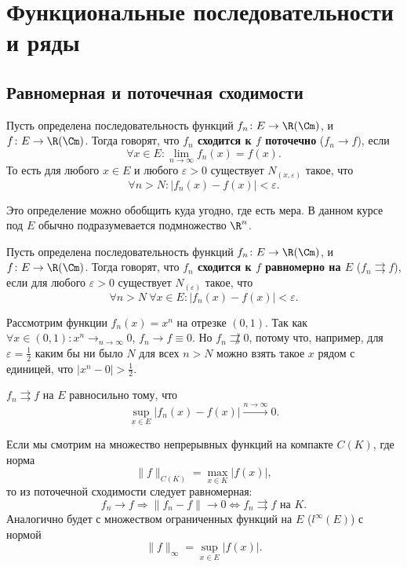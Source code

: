 \chapter{Функциональные последовательности и ряды}
\section{Равномерная и поточечная сходимости}

\begin{defn}
	Пусть определена последовательность функций $ f_n\colon E \to \R (\Cm)$, и $ f\colon E \to \R(\Cm)$. Тогда говорят, что {\bf $ f_n$ сходится к  $ f$ поточечно} ($ f_n \to  f$), если
	\[
		\forall x \in E\colon \lim_{n \to \infty} f_n (x) = f(x)
	.\]
	То есть для любого  $ x \in E$ и любого $ \varepsilon >0$ существует $ N_{(x, \varepsilon )}$ такое, что
	\[
		\forall n > N\colon \lvert f_n(x) - f(x) \rvert < \varepsilon
	.\]
\end{defn}
\begin{note}
	Это определение можно обобщить куда угодно, где есть мера.
	В данном курсе под $ E$ обычно подразумевается подмножество $ \R^{n}$.
\end{note}

\begin{defn}
	Пусть определена последовательность функций $ f_n\colon E \to \R (\Cm)$, и $ f\colon E \to \R(\Cm)$. Тогда говорят, что {\bf $ f_n$ сходится к  $ f$ равномерно на $ E$} ($ f_n \rightrightarrows  f$), если
	для любого $ \varepsilon >0$ существует $ N_{(\varepsilon )}$ такое, что
	\[
		\forall n > N ~ \forall x \in E \colon \lvert f_n(x) - f(x)  \rvert < \varepsilon
	.\]
\end{defn}

\begin{ex}
	Рассмотрим функции $ f_n(x) = x^{n}$ на отрезке $ (0, 1)$. Так как $ \forall x \in  (0, 1)\colon  x^{n} \mathrel{\rightarrow}_{n \to  \infty} 0$, $ f_n \to  f \equiv 0$. Но $ f_n \not\rightrightarrows 0$, потому что, например, для  $ \varepsilon = \frac{1}{2}$ каким бы ни было $ N$ для всех $ n > N$ можно взять такое $ x$ рядом с единицей, что  $ \lvert x^{n}-0 \rvert > \frac{1}{2}$.
\end{ex}

\fontAwesomeSymbol{\faArrowCircleRight}

\begin{st}
	$ f_n \rightrightarrows f$ на $ E$ равносильно тому, что
	\[
		\sup_{x \in E} \lvert f_n(x)-f(x) \rvert \stackrel{n \to  \infty} \longrightarrow 0
	.\]
\end{st}
\begin{rem}
	Если мы смотрим на множество непрерывных функций на компакте $ C(K)$, где норма
	\[
		\| f \| _{C(K)} = \max_{x \in  K} \lvert f(x) \rvert
	,\]
	то из поточечной сходимости следует равномерная:
	\[
		f_{n} \to  f \Longrightarrow \| f_n - f \| \to  0 \Longleftrightarrow f_n \rightrightarrows f \text{ на }  K
	.\]
	Аналогично будет с множеством ограниченных функций на $ E$ ($ l^{\infty}(E)$) с нормой
	\[
		\| f \| _{\infty}  = \sup_{x \in E}\lvert f(x) \rvert
	.\]
\end{rem}

